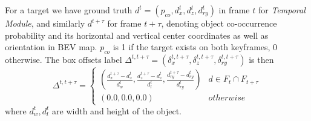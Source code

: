 \documentclass[a4paper, 10pt, conference]{ieeeconf}      %
\begin{document}
For a target we have ground truth $d^t = (p_{co}, d^t_x, d^t_z, d^t_{ry})$ in frame $t$ for \textit{Temporal Module}, and similarly $d^{t+\tau}$ for frame $t+\tau$, denoting object co-occurrence probability and its horizontal and vertical center coordinates as well as orientation in BEV map. $p_{co}$ is 1 if the target exists on both keyframes, 0 otherwise. The box offsets label $\Delta^{t, t+\tau} = (\delta^{t,t+\tau}_{x}, \delta^{t,t+\tau}_{z}, \delta^{t,t+\tau}_{ry})$ is then
\begin{equation}
\Delta^{t, t+\tau} =
\begin{cases}
(\frac{d_{x}^{t+\tau} - d_{x}^{t}}{d^t_{w}}, \frac{d_{z}^{t+\tau} - d_{z}^{t} }{d^t_{l}}, \frac{d_{ry}^{t+\tau} - d_{ry}^{t}}{d^t_{ry}}) & d \in F_t \cap F_{t+\tau} \\
(0.0,0.0, 0.0) &  otherwise
\end{cases}
\end{equation}
where $d^t_{w}, d^t_{l}$ are width and height of the object.


\end{document}
